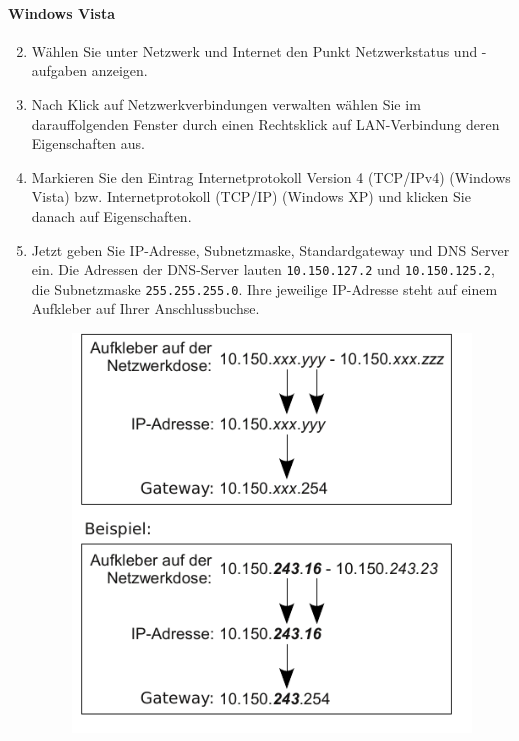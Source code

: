 \documentclass[a4paper,12pt]{scrartcl}
\begin{document}
\paragraph*{Windows Vista}
\begin{enumerate}
    \setcounter{enumi}{1}
    \item Wählen Sie unter Netzwerk und Internet den Punkt Netzwerkstatus und -aufgaben anzeigen.
    \item Nach Klick auf Netzwerkverbindungen verwalten wählen Sie im darauffolgenden Fenster durch einen Rechtsklick auf LAN-Verbindung deren Eigenschaften aus.
    \setcounter{enumi}{4}
    \item Markieren Sie den Eintrag Internetprotokoll Version 4 (TCP/IPv4) (Windows Vista) bzw. Internetprotokoll  (TCP/IP) (Windows XP) und klicken Sie danach auf Eigenschaften.
    \item Jetzt geben Sie IP-Adresse, Subnetzmaske, Standardgateway und DNS Server ein. Die Adressen der DNS-Server lauten \nolinkurl{10.150.127.2} und \nolinkurl{10.150.125.2}, die Subnetzmaske \nolinkurl{255.255.255.0}. Ihre jeweilige IP-Adresse steht auf einem Aufkleber auf Ihrer Anschlussbuchse.
      \begin{figure}[h!]
	\centering
        \vspace{-5pt}
        \begin{minipage}[c]{0.45\linewidth}
          \centering
          \includegraphics[width=\linewidth,keepaspectratio]{Bilder/IP_Gerneric}

\end{minipage}
\end{figure}
\end{enumerate}
\end{document}
